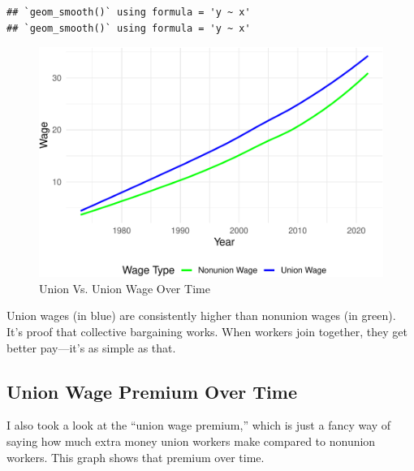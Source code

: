 \documentclass[
]{book}
\theoremstyle{definition}
\theoremstyle{definition}
\theoremstyle{definition}
\theoremstyle{definition}
\theoremstyle{remark}
\begin{document}
\begin{verbatim}
## `geom_smooth()` using formula = 'y ~ x'
## `geom_smooth()` using formula = 'y ~ x'
\end{verbatim}

\begin{figure}
\centering
\includegraphics{_main_files/figure-latex/unionvnot-1.pdf}
\caption{\label{fig:unionvnot}Union Vs. Union Wage Over Time}
\end{figure}

Union wages (in blue) are consistently higher than nonunion wages (in green). It's proof that collective bargaining works. When workers join together, they get better pay---it's as simple as that.

\subsection{Union Wage Premium Over Time}\label{union-wage-premium-over-time}

I also took a look at the ``union wage premium,'' which is just a fancy way of saying how much extra money union workers make compared to nonunion workers. This graph shows that premium over time.
\end{document}
